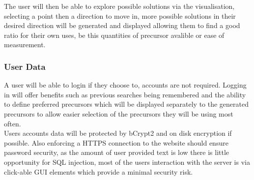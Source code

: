 The user will then be able to explore possible solutions via the visualisation, selecting a point then a direction to move in, more possible solutions in their desired direction will be generated and displayed allowing them to find a good ratio for their own uses, be this quantities of precursor avalible or ease of measurement.

\subsubsection{User Data}
A user will be able to login if they choose to, accounts are not required. Logging in will offer benefits such as previous searches being remembered and the ability to define preferred precursors which will be displayed separately to the generated precursors to allow easier selection of the precursors they will be using most often.\\

Users accounts data will be protected by bCrypt2 and on disk encryption if possible. Also enforcing a HTTPS connection to the website should ensure password security, as the amount of user provided text is low there is little opportunity for SQL injection, most of the users interaction with the server is via click-able GUI elements which provide a minimal security risk.
